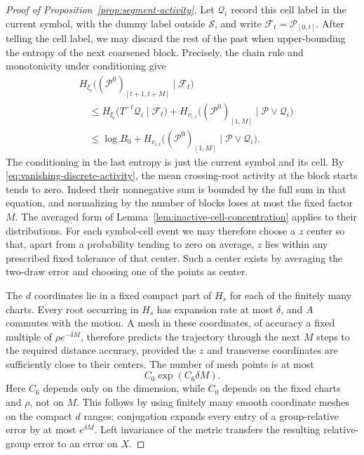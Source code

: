 \begin{proof}[Proof of Proposition~\ref{prop:segment-activity}]
Let $\mathcal Q_i$ record this cell label in the current symbol, with
the dummy label outside $\mathcal S$, and write
$\mathcal F_t=\mathcal P_{[0,t]}$.  After telling the cell label, we may
discard the rest of the past when upper-bounding the entropy of the next
coarsened block.  Precisely, the chain rule and monotonicity under
conditioning give
\begin{equation}\label{eq:coarse-block-entropy}
 \begin{aligned}
 &H_{\xi_i}\bigl((\mathcal P^0)_{[t+1,t+M]}\mid\mathcal F_t\bigr)\\
 &\quad\leq
 H_{\xi_i}\bigl(T^{-t}\mathcal Q_i\mid\mathcal F_t\bigr)
 +H_{\nu_{i,t}}\bigl((\mathcal P^0)_{[1,M]}
                     \mid\mathcal P\vee\mathcal Q_i\bigr)\\
 &\quad\leq\log B_0+
 H_{\nu_{i,t}}\bigl((\mathcal P^0)_{[1,M]}
                     \mid\mathcal P\vee\mathcal Q_i\bigr).
 \end{aligned}
\end{equation}
The conditioning in the last entropy is just the current symbol and
its cell.  By
\eqref{eq:vanishing-discrete-activity}, the mean crossing-root activity at
the block starts tends to zero.  Indeed their nonnegative sum is bounded
by the full sum in that equation, and normalizing by the number of blocks
loses at most the fixed factor $M$.  The averaged form of
Lemma~\ref{lem:inactive-cell-concentration} applies to their distributions.
For each symbol-cell event we may therefore choose a $z$ center so that,
apart from a probability tending to zero on average, $z$ lies within any
prescribed fixed tolerance of that center.  Such a center exists by
averaging the two-draw error and choosing one of the points as center.

The $d$ coordinates lie in a fixed compact part of $H_s$ for each of the
finitely many charts.  Every root occurring in $H_s$ has expansion rate
at most $\delta$, and $A$ commutes with the motion.  A mesh in these
coordinates, of accuracy a fixed multiple of $\rho e^{-\delta M}$,
therefore predicts the trajectory through the next $M$ steps to the
required distance accuracy, provided the $z$ and transverse coordinates
are sufficiently close to their centers.  The number of mesh points is
at most
\begin{equation}\label{eq:slow-direction-mesh}
 C_0\exp(C_6\delta M).
\end{equation}
Here $C_6$ depends only on the dimension, while $C_0$ depends on the fixed
charts and $\rho$, not on $M$.  This follows by using finitely many smooth
coordinate meshes on the compact $d$ ranges: conjugation expands every
entry of a group-relative error by at most $e^{\delta M}$.  Left
invariance of the metric transfers the resulting relative-group error
to an error on $X$.


\end{proof}
